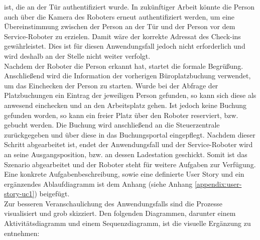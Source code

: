     ist, die an der Tür authentifiziert wurde. In zukünftiger Arbeit könnte die Person auch über die Kamera des Roboters erneut 
    authentifiziert werden, um eine Übereinstimmung zwischen der Person an der Tür und der Person vor dem Service-Roboter zu 
    erzielen. Damit wäre der korrekte Adressat des Check-ins gewährleistet. Dies ist für diesen Anwendungsfall jedoch nicht erforderlich und 
    wird deshalb an der Stelle nicht weiter verfolgt.
    \\
    \linebreak
    Nachdem der Roboter die Person erkannt hat, startet die formale Begrüßung. Anschließend wird die Information der 
    vorherigen Büroplatzbuchung verwendet, um das Einchecken der Person zu starten. Wurde bei der Abfrage der Platzbuchungen ein 
    Eintrag der jeweiligen Person gefunden, so kann sich diese als anwesend einchecken und an den Arbeitsplatz gehen. Ist jedoch keine 
    Buchung gefunden worden, so kann ein freier Platz über den Roboter reserviert, bzw. gebucht werden. Die Buchung wird 
    anschließend an die Steuerzentrale zurückgegeben und über diese in das Buchungsportal eingepflegt. Nachdem dieser 
    Schritt abgearbeitet ist, endet der Anwendungsfall und der Service-Roboter wird an seine Ausgangsposition, bzw. an dessen 
    Ladestation geschickt. Somit ist das Szenario abgearbeitet und der Roboter steht für weitere Aufgaben zur Verfügung. 
    \\
    \linebreak
    Eine konkrete Aufgabenbeschreibung, sowie eine definierte User Story und ein ergänzendes Ablaufdiagramm ist dem Anhang (siehe Anhang \ref{appendix:user-story-uc1}) beigefügt. 
    \\
    Zur besseren Veranschaulichung des Anwendungsfalls sind die Prozesse visualisiert und grob skizziert. Den folgenden Diagrammen, darunter 
    einem Aktivitätsdiagramm und einem Sequenzdiagramm, 
    ist die visuelle Ergänzung zu entnehmen: 
